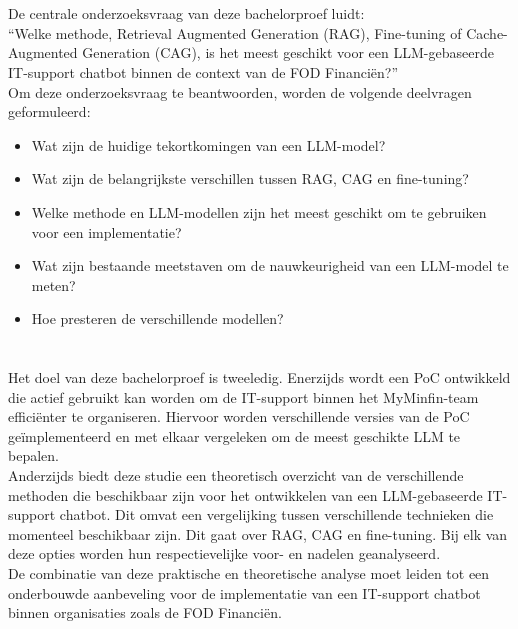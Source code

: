 \section{}%
\label{sec:onderzoeksvraag}

De centrale onderzoeksvraag van deze bachelorproef luidt:
\\[1em]
“{Welke methode, Retrieval Augmented Generation (RAG), Fine-tuning of Cache-Augmented Generation (CAG), is het meest geschikt voor een LLM-gebaseerde IT-support chatbot binnen de context van de FOD Financiën?}”
\\[1em]
Om deze onderzoeksvraag te beantwoorden, worden de volgende deelvragen geformuleerd:

\begin{itemize}
    \item Wat zijn de huidige tekortkomingen van een LLM-model?
    \item Wat zijn de belangrijkste verschillen tussen RAG, CAG en fine-tuning?
    \item Welke methode en LLM-modellen zijn het meest geschikt om te gebruiken voor een implementatie?
    \item Wat zijn bestaande meetstaven om de nauwkeurigheid van een LLM-model te meten?
    \item Hoe presteren de verschillende modellen?
\end{itemize}

\section{}%
\label{sec:onderzoeksdoelstelling}

Het doel van deze bachelorproef is tweeledig. Enerzijds wordt een PoC ontwikkeld die actief gebruikt kan worden om de IT-support binnen het MyMinfin-team efficiënter te organiseren. Hiervoor worden verschillende versies van de PoC geïmplementeerd en met elkaar vergeleken om de meest geschikte LLM te bepalen.
\\[1em]
Anderzijds biedt deze studie een theoretisch overzicht van de verschillende methoden die beschikbaar zijn voor het ontwikkelen van een LLM-gebaseerde IT-support chatbot. Dit omvat een vergelijking tussen verschillende technieken die momenteel beschikbaar zijn. Dit gaat over RAG, CAG en fine-tuning. Bij elk van deze opties worden hun respectievelijke voor- en nadelen geanalyseerd.
\\[1em]
De combinatie van deze praktische en theoretische analyse moet leiden tot een onderbouwde aanbeveling voor de implementatie van een IT-support chatbot binnen organisaties zoals de FOD Financiën.

